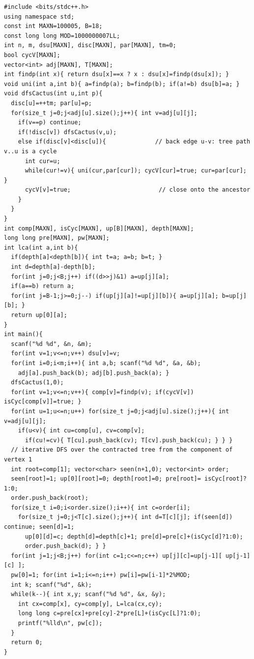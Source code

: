 \begin{lstlisting}[caption={CF 231E. DFS finds each cycle from a back edge, DSU-unions its vertices (total O(n) since cycles are vertex-disjoint); contract to a tree, binary-lift for LCA and fold a root-to-node cycle prefix; answer = 2 to the (heavy nodes on path) mod 1e9+7. ASCII identifiers, no underscores}, label={lst:c31-cactuscount}]
#include <bits/stdc++.h>
using namespace std;
const int MAXN=100005, B=18;
const long long MOD=1000000007LL;
int n, m, dsu[MAXN], disc[MAXN], par[MAXN], tm=0;
bool cycV[MAXN];
vector<int> adj[MAXN], T[MAXN];
int findp(int x){ return dsu[x]==x ? x : dsu[x]=findp(dsu[x]); }
void uni(int a,int b){ a=findp(a); b=findp(b); if(a!=b) dsu[b]=a; }
void dfsCactus(int u,int p){
  disc[u]=++tm; par[u]=p;
  for(size_t j=0;j<adj[u].size();j++){ int v=adj[u][j];
    if(v==p) continue;
    if(!disc[v]) dfsCactus(v,u);
    else if(disc[v]<disc[u]){              // back edge u-v: tree path v..u is a cycle
      int cur=u;
      while(cur!=v){ uni(cur,par[cur]); cycV[cur]=true; cur=par[cur]; }
      cycV[v]=true;                         // close onto the ancestor
    }
  }
}
int comp[MAXN], isCyc[MAXN], up[B][MAXN], depth[MAXN];
long long pre[MAXN], pw[MAXN];
int lca(int a,int b){
  if(depth[a]<depth[b]){ int t=a; a=b; b=t; }
  int d=depth[a]-depth[b];
  for(int j=0;j<B;j++) if((d>>j)&1) a=up[j][a];
  if(a==b) return a;
  for(int j=B-1;j>=0;j--) if(up[j][a]!=up[j][b]){ a=up[j][a]; b=up[j][b]; }
  return up[0][a];
}
int main(){
  scanf("%d %d", &n, &m);
  for(int v=1;v<=n;v++) dsu[v]=v;
  for(int i=0;i<m;i++){ int a,b; scanf("%d %d", &a, &b);
    adj[a].push_back(b); adj[b].push_back(a); }
  dfsCactus(1,0);
  for(int v=1;v<=n;v++){ comp[v]=findp(v); if(cycV[v]) isCyc[comp[v]]=true; }
  for(int u=1;u<=n;u++) for(size_t j=0;j<adj[u].size();j++){ int v=adj[u][j];
    if(u<v){ int cu=comp[u], cv=comp[v];
      if(cu!=cv){ T[cu].push_back(cv); T[cv].push_back(cu); } } }
  // iterative DFS over the contracted tree from the component of vertex 1
  int root=comp[1]; vector<char> seen(n+1,0); vector<int> order;
  seen[root]=1; up[0][root]=0; depth[root]=0; pre[root]= isCyc[root]?1:0;
  order.push_back(root);
  for(size_t i=0;i<order.size();i++){ int c=order[i];
    for(size_t j=0;j<T[c].size();j++){ int d=T[c][j]; if(seen[d]) continue; seen[d]=1;
      up[0][d]=c; depth[d]=depth[c]+1; pre[d]=pre[c]+(isCyc[d]?1:0);
      order.push_back(d); } }
  for(int j=1;j<B;j++) for(int c=1;c<=n;c++) up[j][c]=up[j-1][ up[j-1][c] ];
  pw[0]=1; for(int i=1;i<=n;i++) pw[i]=pw[i-1]*2%MOD;
  int k; scanf("%d", &k);
  while(k--){ int x,y; scanf("%d %d", &x, &y);
    int cx=comp[x], cy=comp[y], L=lca(cx,cy);
    long long c=pre[cx]+pre[cy]-2*pre[L]+(isCyc[L]?1:0);
    printf("%lld\n", pw[c]);
  }
  return 0;
}
\end{lstlisting}

